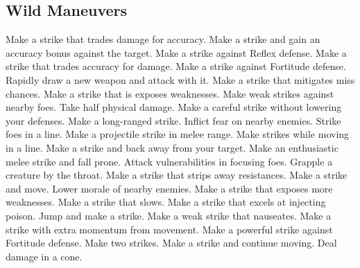 \small
\subsection{Wild Maneuvers}\label{Wild Maneuvers}
\begin{spelllist}
 Make a strike that trades damage for accuracy.
 Make a strike and gain an accuracy bonus against the target.
 Make a strike against Reflex defense.
 Make a strike that trades accuracy for damage.
 Make a strike against Fortitude defense.
 Rapidly draw a new weapon and attack with it.
 Make a strike that mitigates miss chances.
 Make a strike that is exposes weaknesses.
 Make weak strikes against nearby foes.
 Take half physical damage.
 Make a careful strike without lowering your defenses.
 Make a long-ranged strike.
 Inflict fear on nearby enemies.
 Strike foes in a line.
 Make a projectile strike in melee range.
 Make strikes while moving in a line.
 Make a strike and back away from your target.
 Make an enthusiastic melee strike and fall prone.
 Attack vulnerabilities in focusing foes.
 Grapple a creature by the throat.
 Make a strike that strips away resistances.
 Make a strike and move.
 Lower morale of nearby enemies.
 Make a strike that exposes more weaknesses.
 Make a strike that slows.
 Make a strike that excels at injecting poison.
 Jump and make a strike.
 Make a weak strike that nauseates.
 Make a strike with extra momentum from movement.
 Make a powerful strike against Fortitude defense.
 Make two strikes.
 Make a strike and continue moving.
 Deal damage in a cone.

\end{spelllist}

